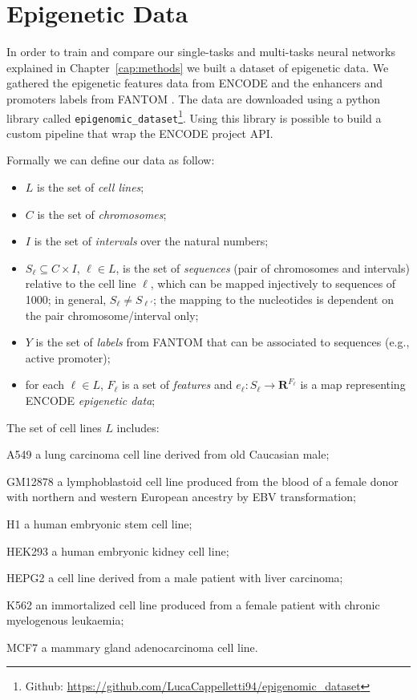 \section{Epigenetic Data} \label{sec:epigenomic_data}

In order to train and compare our single-tasks and multi-tasks neural networks explained in Chapter~\ref{cap:methods} we built a dataset of epigenetic data. We gathered the epigenetic features data from
ENCODE \cite{ENCODE_data} and the enhancers and promoters labels from FANTOM \cite{FANTOM_data}. The data are downloaded using a python library called \verb|epigenomic_dataset|\footnote{Github: \url{https://github.com/LucaCappelletti94/epigenomic_dataset}}. Using this library is possible to build a custom pipeline that wrap the ENCODE project API. 

Formally we can define our data as follow: 
\begin{itemize}
    \item $L$ is the set of \emph{cell lines};
    \item $C$ is the set of \emph{chromosomes};
    \item $I$ is the set of \emph{intervals} over the natural numbers;
    \item $S_\ell\subseteq C\times I$, $\ell\in L$, is the set of \emph{sequences} (pair of chromosomes and intervals) relative to the cell line $\ell$, which can be mapped injectively to sequences of 1000; in general, $S_\ell\neq S_{\ell'}$; the mapping to the nucleotides is dependent on the pair chromosome/interval only;
    \item $Y$ is the set of \emph{labels} from FANTOM that can be associated to sequences (e.g., active promoter);
    \item for each $\ell\in L$, $F_\ell$ is a set of \emph{features} and $e_\ell:S_\ell\to\mathbf R^{F_\ell}$ is a map representing ENCODE \emph{epigenetic data};
\end{itemize}
The set of cell lines $L$ includes: 
\begin{description} 
\item A549 a lung carcinoma cell line derived from old Caucasian male;
\item GM12878 a lymphoblastoid cell line produced from the blood of a female donor with northern and western European ancestry by EBV transformation;
\item H1 a human embryonic stem cell line; 
\item HEK293 a human embryonic kidney cell line;
\item HEPG2 a cell line derived from a male patient with liver carcinoma;
\item K562 an immortalized cell line produced from a female patient with chronic myelogenous leukaemia;
\item MCF7 a mammary gland adenocarcinoma cell line.
\end{description}
